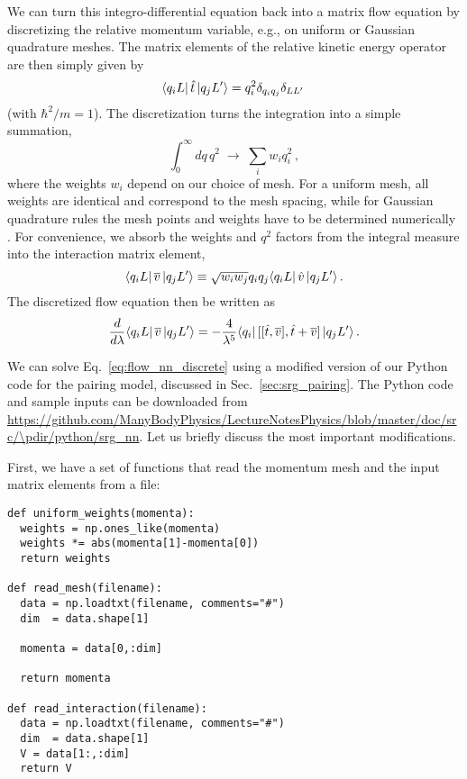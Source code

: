 We can turn this integro-differential equation back into a matrix 
flow equation by discretizing the relative momentum variable, e.g.,
on uniform or Gaussian quadrature meshes. The matrix elements of the 
relative kinetic energy operator are then simply given by
\begin{equation}
  \langle{q_iL}|\,{\hat{t}}\,|{q_jL'}\rangle=q_i^2 \delta_{q_iq_j}\delta_{LL'}\,
\end{equation}
(with $\hbar^2/m=1$). The discretization turns the integration
into a simple summation,
\begin{equation}
  \int_0^\infty dq\,q^2\;\rightarrow\;\sum_{i}w_i q^2_i\,,
\end{equation}
where the weights $w_i$ depend on our choice of mesh. For a uniform
mesh, all weights are identical and correspond to the mesh spacing,
while for Gaussian quadrature rules the mesh points and weights have
to be determined numerically \cite{Press:2007vn}. For convenience,
we absorb the weights and $q^2$ factors from the integral measure into 
the interaction matrix element,
\begin{equation}
  \langle{q_iL}|\,{\overline{v}}\,|{q_jL'}\rangle \equiv \sqrt{w_iw_j}q_i q_j\langle{q_iL}|\,{\hat{v}}\,|{q_jL'}\rangle\,.
\end{equation}
The discretized flow equation then be written as
\begin{equation}\label{eq:flow_nn_discrete}
  \totd{}{\lambda} \matrixe{q_iL}{\overline{v}}{q_jL'} = - \frac{4}{\lambda^5}
    \matrixe{q_i}{\comm{\comm{\tO}{\overline{v}}}{\tO+\overline{v}}}{q_jL'}\,.
\end{equation}

We can solve Eq.~\eqref{eq:flow_nn_discrete} using a modified version of our 
Python code for the pairing model, discussed in Sec.~\ref{sec:srg_pairing}.
The Python code and sample inputs can be downloaded from 
\url{https://github.com/ManyBodyPhysics/LectureNotesPhysics/blob/master/doc/src/\pdir/python/srg_nn}.
Let us briefly discuss the most important modifications.

First, we have a set of functions that read the momentum mesh
and the input matrix elements from a file:
\begin{lstlisting}
def uniform_weights(momenta):
  weights = np.ones_like(momenta)
  weights *= abs(momenta[1]-momenta[0])
  return weights

def read_mesh(filename):
  data = np.loadtxt(filename, comments="#")  
  dim  = data.shape[1]
  
  momenta = data[0,:dim]

  return momenta
  
def read_interaction(filename):
  data = np.loadtxt(filename, comments="#")  
  dim  = data.shape[1]
  V = data[1:,:dim]
  return V
\end{lstlisting}

